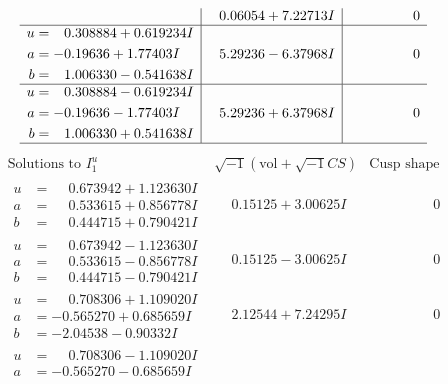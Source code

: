 \documentclass[1p]{elsarticle_modified}
\theoremstyle{definition}
\newcommand{\I}{\sqrt{-1}}
\begin{document}
$$\begin{array}{c|c|c}
 & \phantom{-}0.06054 + 7.22713 I & \phantom{-0.000000 } 0 \\ \hline\begin{aligned}
u &= \phantom{-}0.308884 + 0.619234 I \\
a &= -0.19636 + 1.77403 I \\
b &= \phantom{-}1.006330 - 0.541638 I\end{aligned}
 & \phantom{-}5.29236 - 6.37968 I & \phantom{-0.000000 } 0 \\ \hline\begin{aligned}
u &= \phantom{-}0.308884 - 0.619234 I \\
a &= -0.19636 - 1.77403 I \\
b &= \phantom{-}1.006330 + 0.541638 I\end{aligned}
 & \phantom{-}5.29236 + 6.37968 I & \phantom{-0.000000 } 0\\
 \hline 
 \end{array}$$\newpage$$\begin{array}{c|c|c}  
\text{Solutions to }I^u_{1}& \I (\text{vol} + \sqrt{-1}CS) & \text{Cusp shape}\\
 \hline 
\begin{aligned}
u &= \phantom{-}0.673942 + 1.123630 I \\
a &= \phantom{-}0.533615 + 0.856778 I \\
b &= \phantom{-}0.444715 + 0.790421 I\end{aligned}
 & \phantom{-}0.15125 + 3.00625 I & \phantom{-0.000000 } 0 \\ \hline\begin{aligned}
u &= \phantom{-}0.673942 - 1.123630 I \\
a &= \phantom{-}0.533615 - 0.856778 I \\
b &= \phantom{-}0.444715 - 0.790421 I\end{aligned}
 & \phantom{-}0.15125 - 3.00625 I & \phantom{-0.000000 } 0 \\ \hline\begin{aligned}
u &= \phantom{-}0.708306 + 1.109020 I \\
a &= -0.565270 + 0.685659 I \\
b &= -2.04538 - 0.90332 I\end{aligned}
 & \phantom{-}2.12544 + 7.24295 I & \phantom{-0.000000 } 0 \\ \hline\begin{aligned}
u &= \phantom{-}0.708306 - 1.109020 I \\
a &= -0.565270 - 0.685659 I \\

\end{aligned}
\end{array}$$
\end{document}
